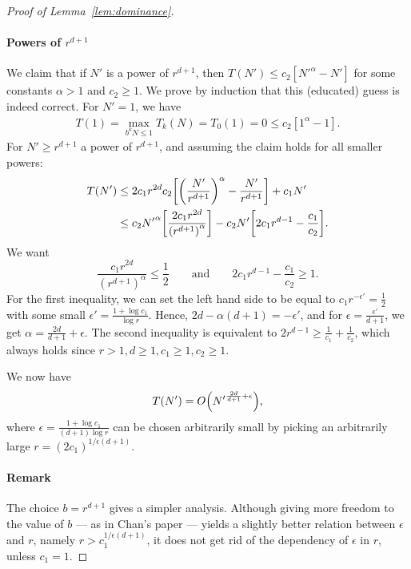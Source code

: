 \begin{proof}[Proof of Lemma~\ref{lem:dominance}]
\paragraph{Powers of $r^{d+1}$}
We claim that if $N'$ is a power of $r^{d+1}$, then $T(N') \le c_2[{N'}^\alpha - N']$
for some constants $\alpha > 1$ and $c_2 \ge 1$. We prove by
induction that this (educated) guess is indeed correct.
For $N' = 1$, we have
\begin{align*}
	T(1)
	=
	\max_{b^{k}N \le 1} T_{k} (N)
	=
	T_0(1)
	=
	0
	\le
	c_2[1^{\alpha} - 1].
\end{align*}
For $N' \ge r^{d+1}$ a power of $r^{d+1}$,
and assuming the claim holds for all smaller powers:
\begin{align*}
	T(N')
	&\le
	2 c_1r^{2d}c_2\mleft[{\mleft(\frac{N'}{r^{d+1}}\mright)}^\alpha
	-\frac{N'}{r^{d+1}}\mright]
	+
	c_1 N'\\
	&\le c_2 {N'}^\alpha
	\mleft[\frac{2c_1r^{2d}}{{(r^{d+1})}^\alpha}\mright]
	- c_2 N' \mleft[2c_1r^{d-1} -
	\frac{c_1}{c_2}\mright].
\end{align*}
We want
\begin{equation*}
\frac{c_1r^{2d}}{{(r^{d+1})}^\alpha} \le \frac 12
\qquad
\text{and}
\qquad
2c_1r^{d-1} - \frac{c_1}{c_2} \ge 1.
\end{equation*}
For the first inequality, we can set the left hand side to be equal to
$c_1 r^{-\epsilon'} = \frac{1}{2}$
with some small $\epsilon' = \frac{1 + \log c_1}{\log r}$.
%
Hence,
$2d - \alpha(d+1) = -\epsilon'$, and for $\epsilon = \frac
{\epsilon'} {d+1}$, we get $\alpha = \frac{2d}{d+1} + \epsilon$.
%
The second inequality is equivalent to
$2r^{d-1} \ge \frac{1}{c_1} + \frac{1}{c_2}$,
which always holds since
$r > 1, d \ge 1, c_1 \ge 1, c_2 \ge 1$.

We now have
\begin{displaymath}
	T(N') = O\mleft({N'}^{\frac{2d}{d+1}+\epsilon}\mright),
\end{displaymath}
where
$\epsilon = \frac{1+\log c_1}{(d+1)\log r}$
can be chosen arbitrarily small by picking
an arbitrarily large
$r = {(2c_1)}^{1/\epsilon (d+1)}$.

\paragraph{Remark}
The choice $b=r^{d+1}$ gives a simpler analysis. Although giving more
freedom to the value of $b$ --- as in Chan's paper --- yields a slightly better
relation between $\epsilon$ and $r$, namely
$r>c_1^{1/\epsilon (d+1)}$, it does not get rid of the dependency
of $\epsilon$ in $r$, unless $c_1=1$.


\end{proof}
